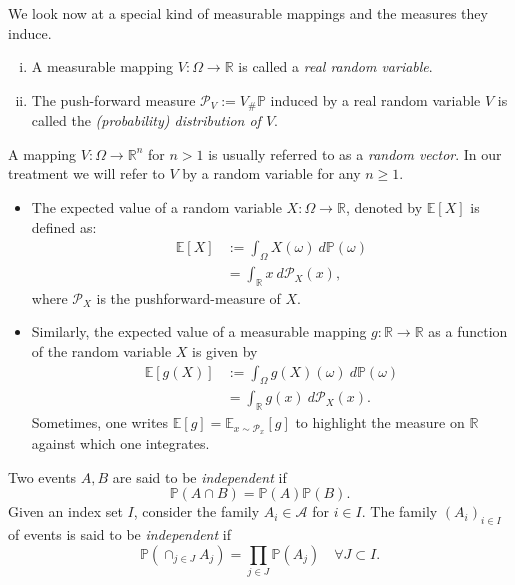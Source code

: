 We look now at a special kind of measurable mappings and the measures they induce.
\begin{definition}
	\label{def:RV}
	\begin{enumerate}[(i)] Let $(\Omega,\mathcal{A}, \mathbb{P})$ be a probability measure space.
		\item A measurable mapping $V: \Omega \to \mathbb{R}$ is called a \emph{real random variable}.
		\item The push-forward measure $\mathcal{P}_V := V_\# \mathbb{P}$ induced by a real random variable $V$ 
		is called the \emph{(probability) distribution of $V$}.		
	\end{enumerate}
\end{definition}
A mapping $V: \Omega \to \mathbb{R}^n$ for $n>1$ is usually referred to as a
\emph{random vector}. In our treatment we will refer to $V$ by a random variable
for any $n\geq 1$. 
\begin{definition}
	\begin{itemize}
		\item The expected value of a random variable $X: \Omega \to
		\mathbb{R}$, denoted by $\mathbb{E}[X]$
		is defined as:
		\begin{align*}
			\mathbb{E}[X] &:= \int_\Omega X(\omega) \ d\mathbb{P}(\omega) \\
			& = \int_\mathbb{R} x \ d\mathcal{P}_X(x),
		\end{align*}
		where $\mathcal{P}_X$ is the pushforward-measure of $X$.
		\item Similarly, the expected value of a measurable mapping $g:
		\mathbb{R}\to \mathbb{R}$ as a function of the random variable $X$ is given by 
		\begin{align*}
			\mathbb{E}[g(X)] &:= \int_\Omega g(X)(\omega) \ d\mathbb{P}(\omega) \\
			& = \int_\mathbb{R} g(x) \ d\mathcal{P}_X(x).
		\end{align*}
		Sometimes, one writes $\mathbb{E}[g] = \mathbb{E}_{x \sim \mathcal{P}_x}[g]$
		to highlight the measure on $\mathbb{R}$ against which one integrates.
	\end{itemize}
\end{definition}


\begin{definition}
Two events $A,B$ are said to be \emph{independent} if $$\mathbb{P}(A \cap B) = \mathbb{P}(A)\mathbb{P}(B).$$ Given 
an index set $I$, consider the family $A_i \in \mathcal{A}$ for $i \in I$. The
family $(A_i)_{i\in I}$ of events is said to be \emph{independent}
if $$\mathbb{P}(\cap_{j \in J} A_j) = \prod_{j \in J} \mathbb{P}(A_j) \quad \forall J \subset I.$$	
\end{definition}


